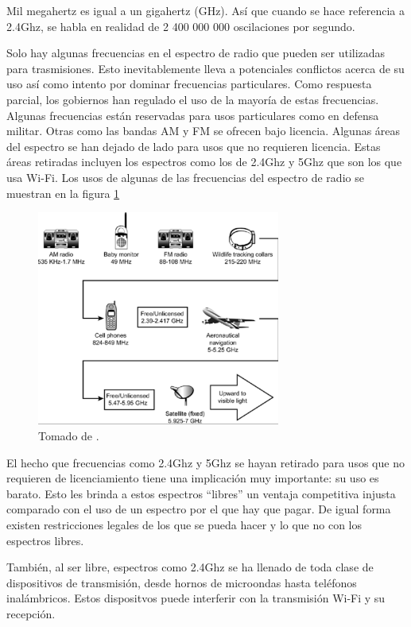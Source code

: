 \documentclass[10pt,journal,compsoc]{IEEEtran}
\begin{document}
Mil megahertz es igual a un gigahertz (GHz). Así que cuando se hace referencia a 2.4Ghz, se habla en realidad de 2 400 000 000 oscilaciones por segundo. 

Solo hay algunas frecuencias en el espectro de radio que pueden ser utilizadas para trasmisiones. Esto inevitablemente lleva a potenciales conflictos acerca de su uso así como intento por dominar frecuencias particulares. Como respuesta parcial, los gobiernos han regulado el uso de la mayoría de estas frecuencias. Algunas frecuencias están reservadas para usos particulares como en defensa militar. Otras como las bandas AM y FM se ofrecen bajo licencia. Algunas áreas del espectro se han dejado de lado para usos que no requieren licencia. Estas áreas retiradas incluyen los espectros como los de 2.4Ghz y 5Ghz que son los que usa Wi-Fi. Los usos de algunas de las frecuencias del espectro de radio se muestran en la figura \ref{fig:espectro-radio}

\begin{figure}[h]
    \centering
    \includegraphics[width=8cm]{espectro-radio}
    \caption{Tomado de \cite{davis}.}
    \label{fig:espectro-radio}
\end{figure}

El hecho que frecuencias como 2.4Ghz y 5Ghz se hayan retirado para usos que no requieren de licenciamiento tiene una implicación muy importante: su uso es barato. Esto les brinda a estos espectros ``libres'' un ventaja competitiva injusta comparado con el uso de un espectro por el que hay que pagar. De igual forma existen restricciones legales de los que se pueda hacer y lo que no con los espectros libres.

También, al ser libre, espectros como 2.4Ghz se ha llenado de toda clase de dispositivos de transmisión, desde hornos de microondas hasta teléfonos inalámbricos. Estos dispositvos puede interferir con la transmisión Wi-Fi y su recepción.
\end{document}
